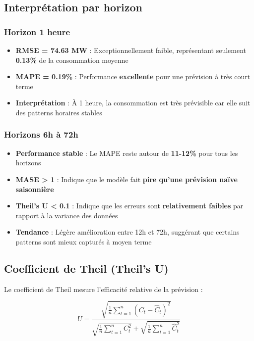 \documentclass[12pt,a4paper]{article}
\begin{document}
\subsection{Interprétation par horizon}

\subsubsection{Horizon 1 heure}

\begin{itemize}
    \item \textbf{RMSE = 74.63 MW} : Exceptionnellement faible, représentant seulement \textbf{0.13\%} de la consommation moyenne
    \item \textbf{MAPE = 0.19\%} : Performance \textbf{excellente} pour une prévision à très court terme
    \item \textbf{Interprétation} : À 1 heure, la consommation est très prévisible car elle suit des patterns horaires stables
\end{itemize}

\subsubsection{Horizons 6h à 72h}

\begin{itemize}
    \item \textbf{Performance stable} : Le MAPE reste autour de \textbf{11-12\%} pour tous les horizons
    \item \textbf{MASE > 1} : Indique que le modèle fait \textbf{pire qu'une prévision naïve saisonnière}
    \item \textbf{Theil's U < 0.1} : Indique que les erreurs sont \textbf{relativement faibles} par rapport à la variance des données
    \item \textbf{Tendance} : Légère amélioration entre 12h et 72h, suggérant que certains patterns sont mieux capturés à moyen terme
\end{itemize}

\subsection{Coefficient de Theil (Theil's U)}

Le coefficient de Theil mesure l'efficacité relative de la prévision :

\begin{equation}
    U = \frac{\sqrt{\frac{1}{n}\sum_{t=1}^{n}(C_t - \hat{C}_t)^2}}{\sqrt{\frac{1}{n}\sum_{t=1}^{n}C_t^2} + \sqrt{\frac{1}{n}\sum_{t=1}^{n}\hat{C}_t^2}}
\end{equation}
\end{document}
